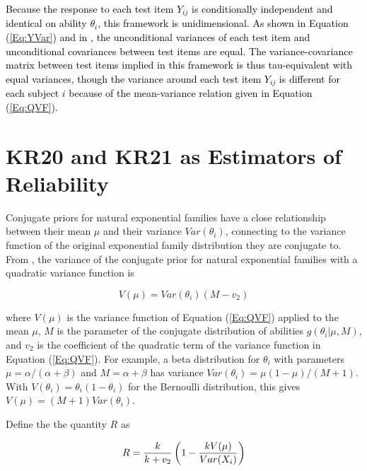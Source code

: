 \documentclass[12pt,epsfig]{article}
\newcommand{\changed}[1]{\textcolor{black}{#1}}
\newcommand{\testlength}{\changed{k}}%
\begin{document}
\changed{Because the response to each test item $Y_{ij}$ is conditionally independent and identical on ability $\theta_i$, this framework is unidimensional. As shown in Equation (\ref{Eq:YVar}) and in \cite{Foster2020}, the unconditional variances of each test item and unconditional covariances between test items are equal. The variance-covariance matrix between test items implied in this framework is thus tau-equivalent with equal variances, though the variance around each test item $Y_{ij}$ is different for each subject $i$ because of the mean-variance relation given in Equation (\ref{Eq:QVF}).}

\section{KR20 and KR21 as Estimators of Reliability}
\label{Sec:Estimators}

Conjugate priors for natural exponential families have a close relationship between their mean $\mu$ and their variance $Var(\theta_i)$, connecting to the variance function of the original exponential family distribution they are conjugate to. From \cite{Morris1983}, the variance of the conjugate prior for natural exponential families with a quadratic variance function is%

\begin{equation}
V(\mu) = Var(\theta_i)(M - v_2)
\label{Eq:MeanVariance}
\end{equation}

\noindent where $V(\mu)$ is the variance function of Equation (\ref{Eq:QVF}) applied to the mean $\mu$, $M$ is the parameter of the conjugate distribution of abilities $g(\theta_i | \mu, M)$, and $v_2$ is the coefficient of the quadratic term of the variance function in Equation (\ref{Eq:QVF}). For example, a beta distribution for $\theta_i$ with parameters $\mu = \alpha/(\alpha + \beta)$ and $M = \alpha + \beta$ has variance $Var(\theta_i) = \mu (1 - \mu)/(M + 1)$. With $V(\theta_i) = \theta_i(1-\theta_i)$ for the Bernoulli distribution, this gives $V(\mu) = (M + 1) Var(\theta_i)$.



Define the the quantity $R$ as

\begin{equation}
R = \dfrac{\testlength}{\testlength + v_2} \left(1 - \dfrac{\testlength V(\mu)}{Var(X_i)}\right)
\label{Eq:GeneralizedKR}
\end{equation}
\end{document}
